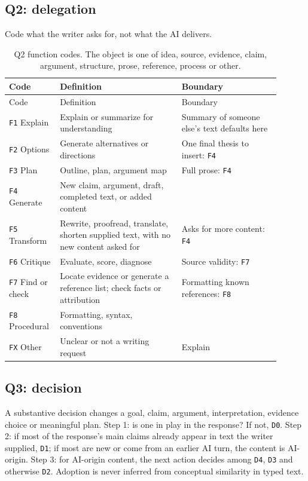 \documentclass[manuscript,screen]{acmart}
\newcommand{\code}[1]{\texttt{#1}}
\begin{document}
\subsection{Q2: delegation}

Code what the writer asks for, not what the AI delivers.

\begin{longtable}{p{0.14\linewidth}p{0.42\linewidth}p{0.34\linewidth}}
\caption{Q2 function codes. The object is one of idea, source, evidence, claim, argument, structure, prose, reference, process or other.}\\
\toprule
Code & Definition & Boundary \\
\midrule
\endfirsthead
\toprule
Code & Definition & Boundary \\
\midrule
\endhead
\code{F1} Explain & Explain or summarize for understanding & Summary of someone else's text defaults here \\
\code{F2} Options & Generate alternatives or directions & One final thesis to insert: \code{F4} \\
\code{F3} Plan & Outline, plan, argument map & Full prose: \code{F4} \\
\code{F4} Generate & New claim, argument, draft, completed text, or added content & \\
\code{F5} Transform & Rewrite, proofread, translate, shorten supplied text, with no new content asked for & Asks for more content: \code{F4} \\
\code{F6} Critique & Evaluate, score, diagnose & Source validity: \code{F7} \\
\code{F7} Find or check & Locate evidence or generate a reference list; check facts or attribution & Formatting known references: \code{F8} \\
\code{F8} Procedural & Formatting, syntax, conventions & \\
\code{FX} Other & Unclear or not a writing request & Explain \\
\bottomrule
\end{longtable}

\subsection{Q3: decision}

A substantive decision changes a goal, claim, argument, interpretation, evidence choice or meaningful plan. Step 1: is one in play in the response? If not, \code{D0}. Step 2: if most of the response's main claims already appear in text the writer supplied, \code{D1}; if most are new or come from an earlier AI turn, the content is AI-origin. Step 3: for AI-origin content, the next action decides among \code{D4}, \code{D3} and otherwise \code{D2}. Adoption is never inferred from conceptual similarity in typed text.
\end{document}
